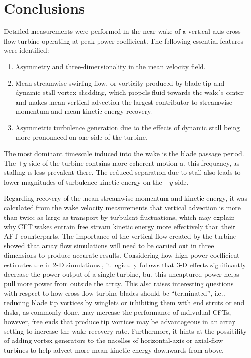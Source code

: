 \section{Conclusions}

Detailed measurements were performed in the near-wake of a vertical axis
cross-flow turbine operating at peak power coefficient. The following essential
features were identified:

\begin{enumerate}
    \item Asymmetry and three-dimensionality in the mean velocity field.

    \item Mean streamwise swirling flow, or vorticity produced by blade tip and
    dynamic stall vortex shedding, which propels fluid towards the wake's center
    and makes mean vertical advection the largest contributor to streamwise
    momentum and mean kinetic energy recovery.

    \item Asymmetric turbulence generation due to the effects of dynamic stall
    being more pronounced on one side of the turbine.
\end{enumerate}

The most dominant timescale induced into the wake is the blade passage period.
The $+y$ side of the turbine contains more coherent motion at this
frequency, as stalling is less prevalent there. The reduced separation due to
stall also leads to lower magnitudes of turbulence kinetic energy on the $+y$
side.

Regarding recovery of the mean streamwise momentum and kinetic energy, it was
calculated from the wake velocity measurements that vertical advection is more
than twice as large as transport by turbulent fluctuations, which may explain
why CFT wakes entrain free stream kinetic energy more effectively than their AFT
counterparts. The importance of the vertical flow created by the turbine showed
that array flow simulations will need to be carried out in three dimensions to
produce accurate results. Considering how high power coefficient estimates are
in 2-D simulations \cite{Li2013}, it logically follows that 3-D effects
significantly decrease the power output of a single turbine, but this uncaptured
power helps pull more power from outside the array. This also raises interesting
questions with respect to how cross-flow turbine blades should be
``terminated'', i.e., reducing blade tip vortices by winglets or inhibiting them
with end struts or end disks, as commonly done, may increase the performance of
individual CFTs, however, free ends that produce tip vortices may be
advantageous in an array setting to increase the wake recovery rate.
Furthermore, it hints at the possibility of adding vortex generators to the
nacelles of horizontal-axis or axial-flow turbines to help advect more mean
kinetic energy downwards from above.

